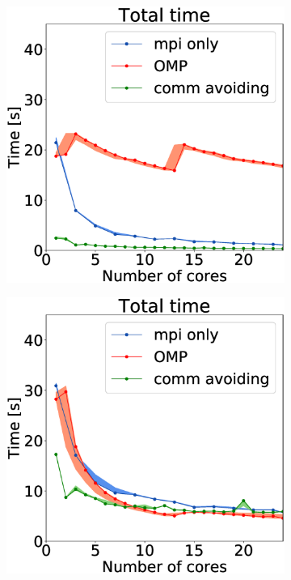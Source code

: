 \newlength{\fsize}
\setlength{\fsize}{0.3\textwidth}
\begin{figure}[H]
	
\begin{subfigure}[c]{\fsize}
\includegraphics[width=\textwidth]{plots/50000our_impl}
\label{fig:mpi_omp_commavoiding_euler_1}
\end{subfigure}

\begin{subfigure}[c]{\fsize}
\includegraphics[width=\textwidth]{plots/10000our_impl}
\label{fig:mpi_omp_commavoiding_euler_2}
\end{subfigure}


\end{figure}

